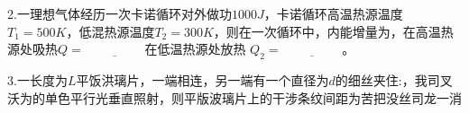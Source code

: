 2.一理想气体经历一次卡诺循环对外做功$1000J$，卡诺循环高温热源温度$T_1=500K$，低混热源温度$T_2=300K$，则在一次循环中，内能增量为，在高温热源处吸热$Q=\underline{\hspace{2cm}}$在低温热源处放热 $Q_2=\underline{\hspace{2cm}}$。

3.一长度为$L$平饭洪璃片，一端相连，另一端有一个直径为$d$的细丝夹住:，我司叉沃为的单色平行光垂直照射，则平版波璃片上的干涉条纹间距为苦把没丝司龙一消